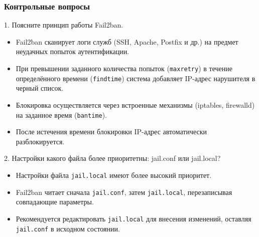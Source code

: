 \begin{frame}
\frametitle{Контрольные вопросы}
1. Поясните принцип работы Fail2ban.
\begin{itemize}
    \item Fail2ban сканирует логи служб (SSH, Apache, Postfix и др.) на предмет неудачных попыток аутентификации.
    \item При превышении заданного количества попыток (\texttt{maxretry}) в течение определённого времени (\texttt{findtime}) система добавляет IP-адрес нарушителя в черный список.
    \item Блокировка осуществляется через встроенные механизмы (iptables, firewalld) на заданное время (\texttt{bantime}).
    \item После истечения времени блокировки IP-адрес автоматически разблокируется.
\end{itemize}

2. Настройки какого файла более приоритетны: jail.conf или jail.local?
\begin{itemize}
    \item Настройки файла \texttt{jail.local} имеют более высокий приоритет.
    \item Fail2ban читает сначала \texttt{jail.conf}, затем \texttt{jail.local}, перезаписывая совпадающие параметры.
    \item Рекомендуется редактировать \texttt{jail.local} для внесения изменений, оставляя \texttt{jail.conf} в исходном состоянии.
\end{itemize}
\end{frame}

